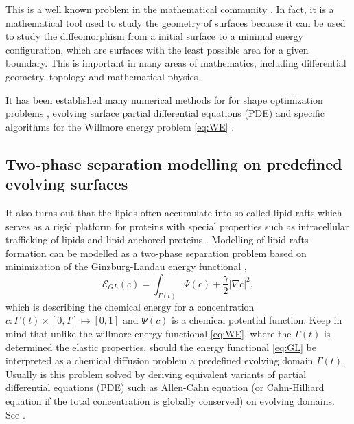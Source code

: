 This is a well known problem in the mathematical community \cite{ topping2000towards, marques2014willmore,link2013gradient,kuwert2012willmore}. In fact, it is a mathematical tool used to study the geometry of surfaces because it can be used to study
the diffeomorphism from a initial surface to a minimal energy configuration, which are surfaces with the least possible area for a given boundary. This is important in many areas of mathematics, including differential geometry, topology and mathematical physics \cite{koerber2021area,jakob2022singularities, rupp21}.

It has been established many numerical methods for for shape optimization problems \cite{sokolowski1992introduction,ito2008variational}, evolving surface partial differential equations (PDE) \cite{dziuk2013finite, dziuk2007finite,
binz2022convergent, barrett2007parametric, barrett2007variational, kovacs2019convergent, lehrenfeld2018stabilized} and specific
algorithms for the Willmore energy problem \eqref{eq:WE} \cite{palmurella2022parametric, dziuk2008computational, bonito2010parametric,  kovacs2021convergent, hu2022evolving}.

\subsection{Two-phase separation modelling on predefined evolving surfaces }%
\label{sub:two_phase_seperation_modelling_on_surfaces_}

It also turns out that the lipids often accumulate into so-called lipid rafts which serves as a rigid platform for proteins with special properties such as intracellular trafficking of lipids and lipid-anchored proteins \cite{ miller2020divide}. Modelling of
lipid rafts formation can be modelled as a two-phase separation problem based on minimization of the Ginzburg-Landau energy functional \cite{yushutin19},
\begin{equation}
\label{eq:GL}
\mathcal{E}_{GL}  \left( c   \right) = \int_{\Gamma\left(t  \right)   }^{}\Psi \left( c \right) + \frac{\gamma}{2} \left\lvert \nabla c \right\rvert^{2} ,
\end{equation}
which is describing the chemical energy for a concentration $c: \Gamma\left( t \right)  \times \left[ 0,T \right] \mapsto  \left[ 0,1 \right]  $ and $ \Psi \left( c \right)$ is a chemical potential function. Keep in mind that unlike
the willmore energy functional \eqref{eq:WE}, where the $\Gamma\left( t \right)  $ is determined the elastic properties, should the energy functional \eqref{eq:GL} be interpreted as a chemical diffusion problem a predefined evolving domain $\Gamma \left( t \right) $.
Usually is this problem solved by deriving equivalent variants of partial differential equations (PDE) such as Allen-Cahn equation (or Cahn-Hilliard equation if the total concentration is globally conserved) on evolving domains. See \cite{yushutin19,
udo97, ratz16,Gera2017, caetano21, elliott2015evolving}.

